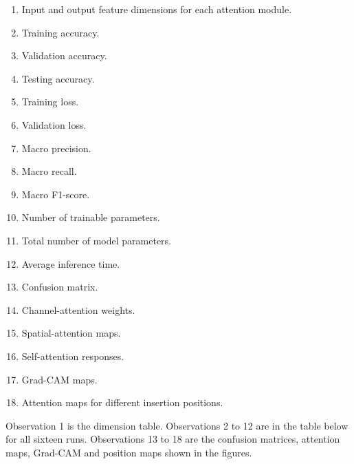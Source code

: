 \documentclass[10pt]{article}
\begin{document}
\begin{enumerate}

\item Input and output feature dimensions for each attention module.

\item Training accuracy.

\item Validation accuracy.

\item Testing accuracy.

\item Training loss.

\item Validation loss.

\item Macro precision.

\item Macro recall.

\item Macro F1-score.

\item Number of trainable parameters.

\item Total number of model parameters.

\item Average inference time.

\item Confusion matrix.

\item Channel-attention weights.

\item Spatial-attention maps.

\item Self-attention responses.

\item Grad-CAM maps.

\item Attention maps for different insertion positions.

\end{enumerate}

Observation 1 is the dimension table. Observations 2 to 12 are in the table below for all sixteen runs. Observations 13 to 18 are the confusion matrices, attention maps, Grad-CAM and position maps shown in the figures.
\end{document}
